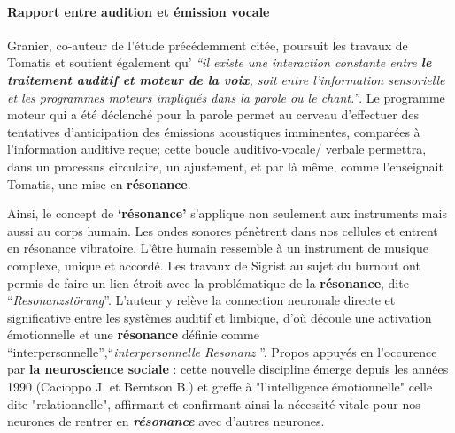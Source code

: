 \paragraph{Rapport entre audition et émission vocale}


Granier, co-auteur de l'étude \autocite{affectiveDisorders} précédemment citée, poursuit les travaux de Tomatis et soutient également qu'\textit{ ``il existe une
interaction
constante entre  \textbf{le traitement auditif et moteur de la
voix}, soit entre l'information sensorielle et les programmes moteurs impliqués
dans la parole ou le chant.''}.
Le programme moteur qui a été déclenché
pour la parole permet au cerveau d'effectuer des tentatives d'anticipation
des émissions acoustiques imminentes, comparées à l'information
auditive reçue; cette boucle
auditivo-vocale/ verbale permettra, dans un processus circulaire, un ajustement,
et par là même, comme l'enseignait Tomatis, une mise en \textbf{résonance}.

Ainsi, le concept de \textbf{`résonance'} s'applique non seulement aux instruments mais aussi au corps humain. Les ondes sonores pénètrent dans nos cellules et entrent en résonance vibratoire. L'être humain ressemble à un instrument de musique complexe, unique et accordé.
Les travaux de Sigrist au sujet du burnout ont permis de faire un lien étroit avec la problématique de la
 \textbf{résonance}, dite \enquote{\textit{Resonanzstörung}}.
L'auteur y relève la connection neuronale
directe et significative entre les systèmes auditif et
         limbique, d'où découle une activation émotionnelle et une
         \textbf{résonance} définie comme
         ``interpersonnelle'',\enquote{\textit{interpersonnelle
             Resonanz} }\autocite[55--90] {sigrist_burnout_2016}.
Propos appuyés en l'occurence par \textbf{la neuroscience sociale} \autocite[201]{van_eersel_cerveau}:  
cette nouvelle discipline émerge depuis
les années 1990 (Cacioppo J. et Berntson B.) et greffe à "l'intelligence
émotionnelle" celle dite "relationnelle", affirmant et confirmant ainsi la nécessité vitale pour nos 
neurones  de rentrer en
 \textbf{ \textit{résonance} }avec d'autres neurones.

